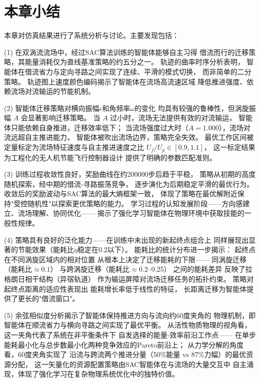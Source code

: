 \section{本章小结}

本章对仿真结果进行了系统分析与讨论。主要发现包括：

(1) 在双涡流流场中，经过SAC算法训练的智能体能够自主习得
借流而行的迁移策略，其能量消耗仅为直线基准策略的约五分之一。
轨迹的曲率时序分析表明，
智能体在借流省力与定向寻路之间实现了连续、平滑的模式切换，
而非简单的二分策略。
轨迹图上速度颜色编码揭示了智能体在流场高流速区域
降低推进强度、依赖流场对流输运的节能机制。

(2) 智能体迁移策略对横向振幅$\epsilon$和角频率$\omega$的变化
均具有较强的鲁棒性，但涡旋振幅 $A$ 会显著影响迁移策略。
当 $A$ 过小时，流场无法提供有效的对流输运，
智能体只能依赖自身推进，迁移效率低下；
当流场强度过大时（$A=1.000$），流场对流远超自主推进能力，
智能体被吹出流场边界，策略完全失效。
最优工作区间被定量标定为流场特征速度与自主推进速度之比
$U_f/U_p \in [0.9, 1.1]$，
这一标定结果为工程化的无人机节能飞行控制器设计
提供了明确的参数匹配准则。

(3) 训练过程收敛性良好，奖励曲线在约200000步后趋于平稳，
策略从初期的高度随机探索，经中期的借流-寻路振荡竞争，
逐步演化为后期稳定平滑的最优行为。
收敛后的奖励波动与SAC算法的最大熵框架一致，
体现了策略在最优解附近保持"受控随机性"以探索更优策略的能力。
学习过程的认知发展阶段——方向感建立、流场理解、协同优化——
揭示了强化学习智能体在物理环境中获取技能的一般性规律。

(4) 策略具有良好的泛化能力——在训练中未出现的新起终点组合上
同样展现出显著的节能效果（能耗比$\eta$稳定在0.2以下）。
能耗比的统计分布进一步揭示：
起终点在不同涡旋区域内的相对位置
从根本上决定了迁移能耗的下限——
同涡旋迁移（能耗比$\approx 0.1$）
与跨涡旋迁移（能耗比$\approx 0.2$--0.25）
之间的能耗差异
反映了拉格朗日相干结构（异宿轨道）
作为输运屏障对流场迁移任务的拓扑约束。
策略对起终点距离的适应性表现出
能耗增长率低于线性的特征，
长距离迁移为智能体提供了更长的"借流窗口"。

(5) 余弦相似度分析揭示了智能体保持推进方向与流向约60度夹角的
物理机制，即智能体在顺流省力与横向寻路之间实现了最优平衡。
从活性物质物理的视角看，这一夹角代表了系统在非平衡条件下
自发选择的能量-效率前沿工作点——
在单步能耗最小化与总步数最小化两种竞争效应的Pareto前沿上；
从力学分解的角度看，60度夹角实现了
沿流与跨流两个推进分量（50\%能量 vs 87\%力幅）的最优资源分配，
这一矢量化的资源配置策略由SAC智能体在与流场的大量交互中
自主涌现，体现了强化学习在复杂物理系统优化中的独特价值。